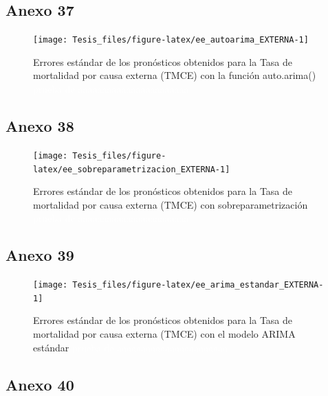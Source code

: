 \documentclass[
]{article}
\begin{document}
\subsection{Anexo 37}

\begin{figure}[H]
\texttt{[image: Tesis\_files/figure-latex/ee\_autoarima\_EXTERNA-1]} \caption{Errores estándar de los pronósticos obtenidos para la Tasa de mortalidad por causa externa (TMCE) con la función auto.arima() \textcolor{white}{prueba de aaaaaaaaaaaaaaaaaaaaaaa}}\label{fig:ee_autoarima_EXTERNA}
\end{figure}

\subsection{Anexo 38}

\begin{figure}[H]
\texttt{[image: Tesis\_files/figure-latex/ee\_sobreparametrizacion\_EXTERNA-1]} \caption{Errores estándar de los pronósticos obtenidos para la Tasa de mortalidad por causa externa (TMCE) con sobreparametrización \textcolor{white}{prueba de aaaaaaaaaaaaaaaaaaaaaaa}}\label{fig:ee_sobreparametrizacion_EXTERNA}
\end{figure}

\subsection{Anexo 39}

\begin{figure}[H]
\texttt{[image: Tesis\_files/figure-latex/ee\_arima\_estandar\_EXTERNA-1]} \caption{Errores estándar de los pronósticos obtenidos para la Tasa de mortalidad por causa externa (TMCE) con el modelo ARIMA estándar \textcolor{white}{prueba de aaaaaaaaaaaaaaaaaaaaaaa}}\label{fig:ee_arima_estandar_EXTERNA}
\end{figure}

\subsection{Anexo 40}
\end{document}
